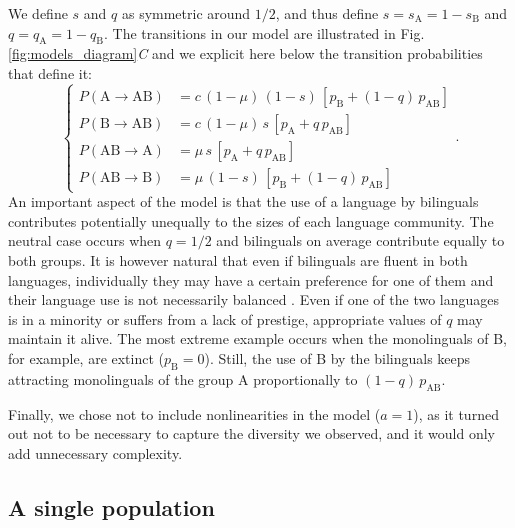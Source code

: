 \documentclass[../thesis.tex]{subfiles}
\begin{document}
We define $s$ and $q$ as symmetric around $1/2$, and thus define $s = s_\text{A} = 1 -
s_\text{B}$ and $q = q_\text{A} = 1 - q_\text{B}$. The transitions in our model are
illustrated in Fig. \ref{fig:models_diagram}\textit{C} and we explicit here below the
transition probabilities that define it:
\begin{equation}
\label{eq:bipref_model}
\left\{
\begin{aligned}
    P (\text{A} \rightarrow \text{AB}) &= c \, (1 - \mu) \, (1-s) \, \left[ p_{\text{B}} + (1-q) \,  p_{\text{AB}} \right] \\
    P (\text{B} \rightarrow \text{AB}) &= c \, (1 - \mu) \, s \, \left[ p_{\text{A}} + q \, p_{\text{AB}} \right] \\
    P (\text{AB} \rightarrow \text{A}) &= \mu \, s \, \left[ p_{\text{A}} + q \, p_{\text{AB}} \right] \\
    P (\text{AB} \rightarrow \text{B}) &= \mu \, (1-s) \, \left[ p_{\text{B}} + (1-q) \, p_{\text{AB}} \right]
\end{aligned}
\right. .
\end{equation}
An important aspect of the model is that the use of a language by bilinguals contributes
potentially unequally to the sizes of each language community. The neutral case occurs
when $q = 1/2$ and bilinguals on average contribute equally to both groups. It is
however natural that even if bilinguals are fluent in both languages, individually they
may have a certain preference for one of them and their language use is not necessarily
balanced \cite{RomaineBilingualMultilingual2012}. Even if one of the two languages is in
a minority or suffers from a lack of prestige, appropriate values of $q$ may maintain it
alive. The most extreme example occurs when the monolinguals of B, for example, are
extinct ($p_{\text{B}} = 0$). Still, the use of B by the bilinguals keeps attracting
monolinguals of the group A proportionally to $(1-q)\, p_{\text{AB}}$.

Finally, we chose not to include nonlinearities in the model ($a = 1$), as it turned out
not to be necessary to capture the diversity we observed, and it would only add
unnecessary complexity.


\subsection{A single population}
\end{document}
